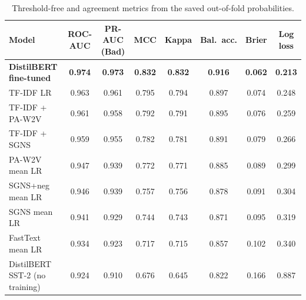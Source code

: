 \begin{table}[H]
\centering
\footnotesize
\caption{Threshold-free and agreement metrics from the saved out-of-fold probabilities.}
\label{tab:sentextra}
\begin{tabular}{lccccccc}
\toprule
Model & ROC-AUC & PR-AUC (Bad) & MCC & Kappa & Bal.\ acc. & Brier & Log loss \\
\midrule
\textbf{DistilBERT fine-tuned} & \textbf{0.974} & \textbf{0.973} & \textbf{0.832} & \textbf{0.832} & \textbf{0.916} & \textbf{0.062} & \textbf{0.213} \\
TF-IDF LR & 0.963 & 0.961 & 0.795 & 0.794 & 0.897 & 0.074 & 0.248 \\
TF-IDF + PA-W2V & 0.961 & 0.958 & 0.792 & 0.791 & 0.895 & 0.076 & 0.259 \\
TF-IDF + SGNS & 0.959 & 0.955 & 0.782 & 0.781 & 0.891 & 0.079 & 0.266 \\
PA-W2V mean LR & 0.947 & 0.939 & 0.772 & 0.771 & 0.885 & 0.089 & 0.299 \\
SGNS+neg mean LR & 0.946 & 0.939 & 0.757 & 0.756 & 0.878 & 0.091 & 0.304 \\
SGNS mean LR & 0.941 & 0.929 & 0.744 & 0.743 & 0.871 & 0.095 & 0.319 \\
FastText mean LR & 0.934 & 0.923 & 0.717 & 0.715 & 0.857 & 0.102 & 0.340 \\
DistilBERT SST-2 (no training) & 0.924 & 0.910 & 0.676 & 0.645 & 0.822 & 0.166 & 0.887 \\
\bottomrule
\end{tabular}
\end{table}